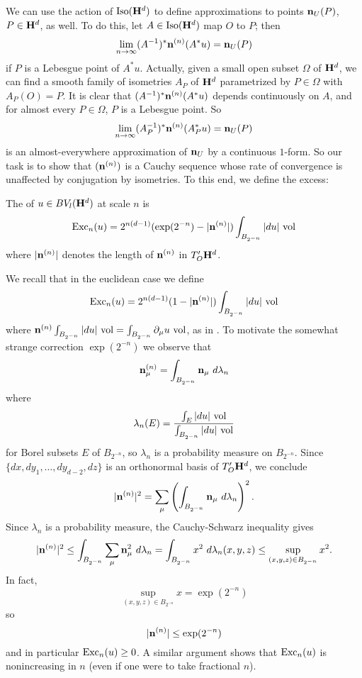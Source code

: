 We can use the action of $\operatorname{Iso}(\mathbf H^d)$ to define approximations to points $\mathbf n_U(P)$, $P \in \mathbf H^d$, as well.
To do this, let $A \in \operatorname{Iso}(\mathbf H^d)$ map $O$ to $P$; then 
$$\lim_{n \to \infty} (A^{-1})^* \mathbf n^{(n)}(A^* u) = \mathbf n_U(P)$$
if $P$ is a Lebesgue point of $A^* u$.
Actually, given a small open subset $\Omega$ of $\mathbf H^d$, we can find a smooth family of isometries $A_P$ of $\mathbf H^d$ parametrized by $P \in \Omega$ with $A_P(O) = P$.
It is clear that $(A^{-1})^* \mathbf n^{(n)}(A^* u)$ depends continuously on $A$, and for almost every $P \in \Omega$, $P$ is a Lebesgue point.
So
$$\lim_{n \to \infty} (A_P^{-1})^* \mathbf n^{(n)}(A_P^* u) = \mathbf n_U(P)$$
is an almost-everywhere approximation of $\mathbf n_U$ by a continuous $1$-form.
So our task is to show that $(\mathbf n^{(n)})$ is a Cauchy sequence whose rate of convergence is unaffected by conjugation by isometries.
To this end, we define the excess:

\begin{definition}
The  of $u \in BV_l(\mathbf H^d)$ at scale $n$ is
$$\operatorname{Exc}_n(u) = 2^{n(d - 1)} (\exp(2^{-n}) - |\mathbf n^{(n)}|) \int_{B_{2^{-n}}} |du| ~\mathrm{vol}$$
where $|\mathbf n^{(n)}|$ denotes the length of $\mathbf n^{(n)}$ in $T_O' \mathbf H^d$.
\end{definition}

We recall that in the euclidean case we define 
$$\operatorname{Exc}_n(u) = 2^{n(d - 1)} (1 - |\mathbf n^{(n)}|) \int_{B_{2^{-n}}} |du| ~\mathrm{vol}$$
where $\mathbf n^{(n)} \int_{B_{2^{-n}}} |du| ~\mathrm{vol} = \int_{B_{2^{-n}}} \partial_\mu u ~\mathrm{vol}$, as in \cite[Chapter 6]{Giusti77}.
To motivate the somewhat strange correction $\exp(2^{-n})$ we observe that
$$\mathbf n^{(n)}_\mu = \int_{B_{2^{-n}}} \mathbf n_\mu ~d\lambda_n$$
where
$$\lambda_n(E) = \frac{\int_E |du|~\mathrm{vol}}{\int_{B_{2^{-n}}} |du| ~\mathrm{vol}}$$
for Borel subsets $E$ of $B_{2^{-n}}$, so $\lambda_n$ is a probability measure on $B_{2^{-n}}$.
Since $\{dx, dy_1, \dots, dy_{d-2}, dz\}$ is an orthonormal basis of $T_O' \mathbf H^d$, we conclude
$$|\mathbf n^{(n)}|^2 = \sum_\mu \left(\int_{B_{2^{-n}}} \mathbf n_\mu ~d\lambda_n\right)^2.$$
Since $\lambda_n$ is a probability measure, the Cauchy-Schwarz inequality gives
$$|\mathbf n^{(n)}|^2 \leq \int_{B_{2^{-n}}} \sum_\mu \mathbf n_\mu^2 ~d\lambda_n = \int_{B_{2^{-n}}} x^2 ~d\lambda_n(x, y, z) \leq \sup_{(x, y, z) \in B_{2^{-n}}} x^2.$$
In fact, 
\begin{equation}\label{sup in a ball}
\sup_{(x, y, z) \in B_{2^{-n}}} x = \exp(2^{-n})
\end{equation}
so
\begin{equation}\label{conormal length bound}
|\mathbf n^{(n)}| \leq \exp(2^{-n})
\end{equation}
and in particular $\operatorname{Exc}_n(u) \geq 0$.
A similar argument shows that $\operatorname{Exc}_n(u)$ is nonincreasing in $n$ (even if one were to take fractional $n$).


